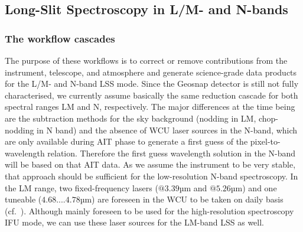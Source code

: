 \subsection{Long-Slit Spectroscopy in L/M- and N-bands}\label{lss:overview}
\subsubsection{The workflow cascades}\label{lss:cascade_overview}
The purpose of these workflows is to correct or remove contributions from
the instrument, telescope, and atmosphere and generate science-grade
data products for the L/M- and N-band \ac{LSS}
mode. Since the Geosnap detector is still not fully characterised, we currently assume basically the same reduction cascade for both spectral ranges LM and N, respectively. The major differences at the time being are the subtraction methods for the sky background (nodding in LM, chop-nodding in N band) and the absence of \ac{WCU} laser sources in the N-band, which are only available during \ac{AIT} phase to generate a first guess of the pixel-to-wavelength relation. Therefore the first guess wavelength solution in the N-band will be based on that \ac{AIT} data. As we assume the instrument to be very stable, that approach should be sufficient for the low-resolution N-band spectroscopy. In the LM range, two fixed-frequency lasers ($@3.39$µm and $@5.26$µm) and one tuneable ($4.68....4.78$µm) are foreseen in the \ac{WCU} to be taken on daily basis (cf.~\cite{METIS-calibration_plan}). Although mainly foreseen to be used for the high-resolution spectroscopy \ac{IFU} mode, we can use these laser sources for the LM-band \ac{LSS} as well.

